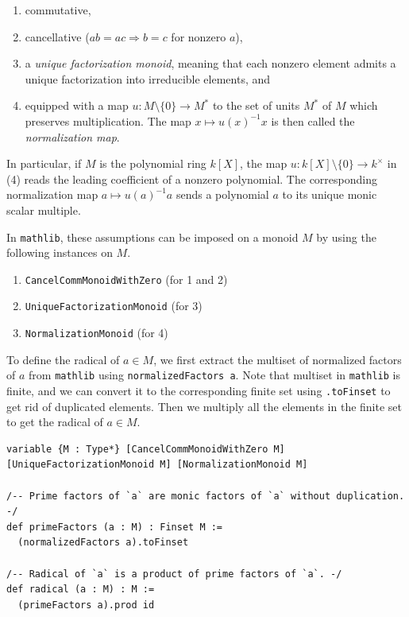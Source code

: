 \documentclass[runningheads]{llncs}
\begin{document}
\begin{enumerate}
    \item commutative,
    \item cancellative ($ab = ac \Rightarrow b=c$ for nonzero $a$),
    \item a \emph{unique factorization monoid}, meaning that each nonzero element admits a unique factorization into irreducible elements, and
    \item 
    equipped with a map $u : M \setminus \{0\} \rightarrow M^*$ to the set of units $M^*$ of $M$ which preserves multiplication. The map $x \mapsto u(x)^{-1} x$ is then called the \emph{normalization map}.
\end{enumerate}
In particular, if $M$ is the polynomial ring $k[X]$, the map $u : k[X] \setminus \{0\} \rightarrow k^\times$ in (4) reads the leading coefficient of a nonzero polynomial. The corresponding normalization map $a \mapsto u(a)^{-1} a$ sends a polynomial $a$ to its unique monic scalar multiple.

In \texttt{mathlib}, these assumptions can be imposed on a monoid $M$ by using the following instances on $M$.
\begin{enumerate}[label=(\roman*)]
    \item \texttt{CancelCommMonoidWithZero} (for 1 and 2)
    \item \texttt{UniqueFactorizationMonoid} (for 3)
    \item \texttt{NormalizationMonoid} (for 4)
\end{enumerate}

To define the radical of $a \in M$, we first extract the multiset of 
normalized factors of $a$ from \texttt{mathlib} using \texttt{normalizedFactors a}.
Note that multiset in \texttt{mathlib} is finite, and we can convert it to the corresponding finite set using \texttt{.toFinset} to get rid of duplicated elements.
Then we multiply all the elements in the finite set to get the radical of $a \in M$.

\begin{verbatim}
variable {M : Type*} [CancelCommMonoidWithZero M] [UniqueFactorizationMonoid M] [NormalizationMonoid M]

/-- Prime factors of `a` are monic factors of `a` without duplication. -/
def primeFactors (a : M) : Finset M :=
  (normalizedFactors a).toFinset

/-- Radical of `a` is a product of prime factors of `a`. -/
def radical (a : M) : M :=
  (primeFactors a).prod id
\end{verbatim}
\end{document}
